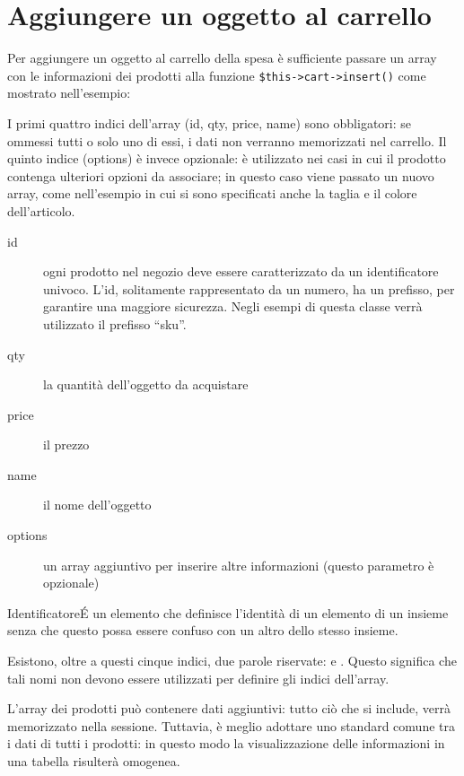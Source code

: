 \section*{Aggiungere un oggetto al carrello}
Per aggiungere un oggetto al carrello della spesa è sufficiente passare un array con le informazioni dei prodotti alla funzione \verb|$this->cart->insert()| come mostrato nell'esempio:


I primi quattro indici dell'array (id, qty, price, name) sono obbligatori: se ommessi tutti o solo uno di essi, i dati non verranno memorizzati nel carrello. Il quinto indice (options) è invece opzionale: è utilizzato nei casi in cui il prodotto contenga ulteriori opzioni da associare; in questo caso viene passato un nuovo array, come nell'esempio in cui si sono specificati anche la taglia e il colore dell'articolo.

\begin{description}
\item[id] ogni prodotto nel negozio deve essere caratterizzato da un identificatore univoco. L'id, solitamente rappresentato da un numero, ha un prefisso, per garantire una maggiore sicurezza. Negli esempi di questa classe verrà utilizzato il prefisso ``sku''.
\item [qty] la quantità dell'oggetto da acquistare
\item [price] il prezzo
\item [name] il nome dell'oggetto
\item [options] un array aggiuntivo per inserire altre informazioni (questo parametro è opzionale)
\end{description}

\begin{deftab}{Identificatore}{\'E un elemento che definisce l'identità di un elemento di un insieme senza che questo possa essere confuso con un altro dello stesso insieme.}
\end{deftab}

Esistono, oltre a questi cinque indici, due parole riservate:  e . Questo significa che tali nomi non devono essere utilizzati per definire gli indici dell'array.

L'array dei prodotti può contenere dati aggiuntivi: tutto ciò che si include, verrà memorizzato nella sessione. Tuttavia, è meglio adottare uno standard comune tra i dati di tutti i prodotti: in questo modo la visualizzazione delle informazioni in una tabella risulterà omogenea.

